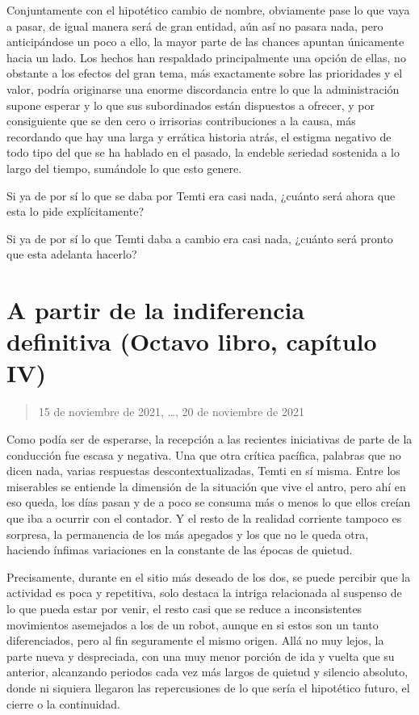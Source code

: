 \documentclass[
  spanish,
]{book}
\begin{document}
Conjuntamente con el hipotético cambio de nombre, obviamente pase lo que vaya a pasar, de igual manera será de gran entidad, aún así no pasara nada, pero anticipándose un poco a ello, la mayor parte de las chances apuntan únicamente hacia un lado. Los hechos han respaldado principalmente una opción de ellas, no obstante a los efectos del gran tema, más exactamente sobre las prioridades y el valor, podría originarse una enorme discordancia entre lo que la administración supone esperar y lo que sus subordinados están dispuestos a ofrecer, y por consiguiente que se den cero o irrisorias contribuciones a la causa, más recordando que hay una larga y errática historia atrás, el estigma negativo de todo tipo del que se ha hablado en el pasado, la endeble seriedad sostenida a lo largo del tiempo, sumándole lo que esto genere.

Si ya de por sí lo que se daba por Temti era casi nada, ¿cuánto será ahora que esta lo pide explícitamente?

Si ya de por sí lo que Temti daba a cambio era casi nada, ¿cuánto será pronto que esta adelanta hacerlo?

\hypertarget{a-partir-de-la-indiferencia-definitiva-octavo-libro-capuxedtulo-iv}{%
\section{A partir de la indiferencia definitiva (Octavo libro, capítulo IV)}\label{a-partir-de-la-indiferencia-definitiva-octavo-libro-capuxedtulo-iv}}

\begin{quote}
15 de noviembre de 2021, \ldots, 20 de noviembre de 2021
\end{quote}

Como podía ser de esperarse, la recepción a las recientes iniciativas de parte de la conducción fue escasa y negativa. Una que otra crítica pacífica, palabras que no dicen nada, varias respuestas descontextualizadas, Temti en sí misma. Entre los miserables se entiende la dimensión de la situación que vive el antro, pero ahí en eso queda, los días pasan y de a poco se consuma más o menos lo que ellos creían que iba a ocurrir con el contador. Y el resto de la realidad corriente tampoco es sorpresa, la permanencia de los más apegados y los que no le queda otra, haciendo ínfimas variaciones en la constante de las épocas de quietud.

Precisamente, durante en el sitio más deseado de los dos, se puede percibir que la actividad es poca y repetitiva, solo destaca la intriga relacionada al suspenso de lo que pueda estar por venir, el resto casi que se reduce a inconsistentes movimientos asemejados a los de un robot, aunque en si estos son un tanto diferenciados, pero al fin seguramente el mismo origen. Allá no muy lejos, la parte nueva y despreciada, con una muy menor porción de ida y vuelta que su anterior, alcanzando periodos cada vez más largos de quietud y silencio absoluto, donde ni siquiera llegaron las repercusiones de lo que sería el hipotético futuro, el cierre o la continuidad.
\end{document}
